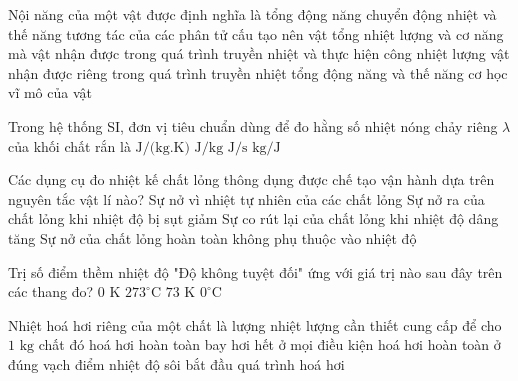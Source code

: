 \begin{ex}	Nội năng của một vật được định nghĩa là
	\choice
	{\True tổng động năng chuyển động nhiệt và thế năng tương tác của các phân tử cấu tạo nên vật}
	{tổng nhiệt lượng và cơ năng mà vật nhận được trong quá trình truyền nhiệt và thực hiện công}
	{nhiệt lượng vật nhận được riêng trong quá trình truyền nhiệt}
	{tổng động năng và thế năng cơ học vĩ mô của vật}
\end{ex}

\begin{ex}	Trong hệ thống SI, đơn vị tiêu chuẩn dùng để đo hằng số nhiệt nóng chảy riêng $\lambda$ của khối chất rắn là
	\choice
	{$\text{J/(kg.K)}$}
	{\True $\text{J/kg}$}
	{$\text{J/s}$}
	{$\text{kg/J}$}
\end{ex}

\begin{ex}	Các dụng cụ đo nhiệt kế chất lỏng thông dụng được chế tạo vận hành dựa trên nguyên tắc vật lí nào?
	\choice
	{\True Sự nở vì nhiệt tự nhiên của các chất lỏng}
	{Sự nở ra của chất lỏng khi nhiệt độ bị sụt giảm}
	{Sự co rút lại của chất lỏng khi nhiệt độ dâng tăng}
	{Sự nở của chất lỏng hoàn toàn không phụ thuộc vào nhiệt độ}
\end{ex}

\begin{ex}	Trị số điểm thềm nhiệt độ "Độ không tuyệt đối" ứng với giá trị nào sau đây trên các thang đo?
	\choice
	{\True $0\text{ K}$}
	{$273^\circ\text{C}$}
	{$73\text{ K}$}
	{$0^\circ\text{C}$}
\end{ex}

\begin{ex}	Nhiệt hoá hơi riêng của một chất là lượng nhiệt lượng cần thiết cung cấp để cho $1\text{ kg}$ chất đó
	\choice
	{hoá hơi hoàn toàn}
	{bay hơi hết ở mọi điều kiện}
	{\True hoá hơi hoàn toàn ở đúng vạch điểm nhiệt độ sôi}
	{bắt đầu quá trình hoá hơi}
\end{ex}

